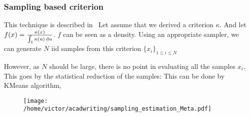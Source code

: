 \documentclass[../../Main_ManuscritThese.tex]{subfiles}
\begin{document}
\subsubsection{Sampling based criterion}
\label{sec:sampling_based_criterion}
This technique is described in~\cite{dubourg_reliability-based_2011}
Let assume that we derived a criterion $\kappa$. And let $f(x) = \frac{\kappa(x)}{\int_{\mathbb{X}}\kappa(u)\,\mathrm{d}u}$. $f$ can be seen as a density.
  Using an appropriate sampler, we can generate $N$ iid samples from this criterion $\{x_i\}_{1\leq i \leq N}$
  
  However, as $N$ should be large, there is no point in evaluating all the samples $x_i$. This goes by the statistical reduction of the samples:
  This can be done by KMeans algorithm, 

\begin{figure}[ht]
  \centering
  \texttt{[image: /home/victor/acadwriting/sampling\_estimation\_Meta.pdf]}
  \caption{\label{fig:label} }
\end{figure}


\subfileLocal{
	\pagestyle{empty}
	
	
}
\end{document}
